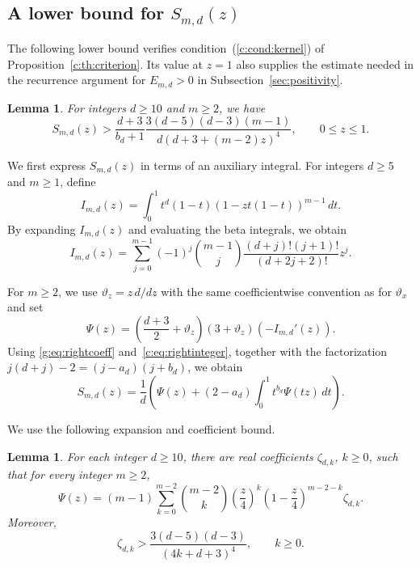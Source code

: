 \documentclass[10pt,a4paper]{article}
\numberwithin{equation}{section}
\newtheorem{lemma}[theorem]{Lemma}
\theoremstyle{remark}\newtheorem{remark}[theorem]{Remark}
\newcommand{\varthetax}{\vartheta_x}
\begin{document}
\subsection{A lower bound for \texorpdfstring{$S_{m,d}(z)$}{S(z)}}\label{sec:kernel}
The following lower bound verifies condition~(\ref{c:cond:kernel}) of
Proposition~\ref{c:th:criterion}. Its value at $z=1$ also supplies the
estimate needed in the recurrence argument for $E_{m,d}>0$ in
Subsection~\ref{sec:positivity}.

\begin{lemma}\label{g:lem:kernel}
For integers $d\ge10$ and $m\ge2$, we have
\begin{equation*}
 S_{m,d}(z)>
 \frac{d+3}{b_d+1}
 \frac{3(d-5)(d-3)(m-1)}{d(d+3+(m-2)z)^4},
 \qquad 0\le z\le1.
\end{equation*}
\end{lemma}

We first express $S_{m,d}(z)$ in terms of an auxiliary integral.
For integers $d\ge5$ and $m\ge1$, define
\[
 I_{m,d}(z)=\int_0^1t^d(1-t)(1-zt(1-t))^{m-1}\,dt.
\]
By expanding $I_{m,d}(z)$ and evaluating the beta integrals, we obtain
\begin{equation}\label{g:eq:rightcoeff}
 I_{m,d}(z)=\sum_{j=0}^{m-1}(-1)^j\binom{m-1}{j}
 \frac{(d+j)!(j+1)!}{(d+2j+2)!}z^j.
\end{equation}

For $m\ge2$, we use $\vartheta_z=z\,d/dz$ with the same coefficientwise convention
as for $\varthetax$ and set
\[
 \Psi(z)=\left(\frac{d+3}{2}+\vartheta_z\right)
 (3+\vartheta_z)(-I_{m,d}'(z)).
\]
Using \eqref{g:eq:rightcoeff} and~\eqref{c:eq:rightinteger}, together with
the factorization $j(d+j)-2=(j-a_d)(j+b_d)$, we obtain
\begin{equation}\label{g:eq:Sop}
 S_{m,d}(z)=\frac1d\left(\Psi(z)
 +(2-a_d)\int_0^1t^{b_d}\Psi(tz)\,dt\right).
\end{equation}

We use the following expansion and coefficient bound.

\begin{lemma}\label{g:lem:coefflower}
For each integer $d\ge10$, there are real coefficients $\zeta_{d,k}$,
$k\ge0$, such that for every integer $m\ge2$,
\begin{equation}\label{g:eq:Psibinomial}
 \Psi(z)=(m-1)\sum_{k=0}^{m-2}\binom{m-2}{k}
 \left(\frac z4\right)^k\left(1-\frac z4\right)^{m-2-k}\zeta_{d,k}.
\end{equation}
Moreover,
\[
 \zeta_{d,k}>\frac{3(d-5)(d-3)}{(4k+d+3)^4},\qquad k\ge0.
\]
\end{lemma}
\end{document}
